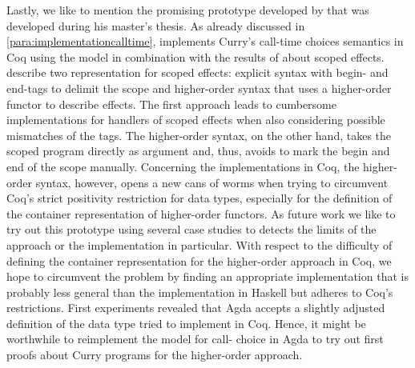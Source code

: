 Lastly, we like to mention the promising prototype developed by \citet{bunkenburg2019modeling} that was developed during his master's thesis.
As already discussed in \autoref{para:implementationcalltime}, \citeauthor{bunkenburg2019modeling} implements Curry's call-time choices semantics in Coq using the  model in combination with the results of \citet{wu2014effect} about scoped effects.
\citeauthor{wu2014effect} describe two representation for scoped effects: explicit syntax with begin- and end-tags to delimit the scope and higher-order syntax that uses a higher-order functor to describe effects.
The first approach leads to cumbersome implementations for handlers of scoped effects when also considering possible mismatches of the tags.
The higher-order syntax, on the other hand, takes the scoped program directly as argument and, thus, avoids to mark the begin and end of the scope manually.
Concerning the implementations in Coq, the higher-order syntax, however, opens a new cans of worms when trying to circumvent Coq's strict positivity restriction for data types, especially for the definition of the container representation of higher-order functors.
As future work we like to try out this prototype using several case studies to detects the limits of the approach or the implementation in particular.
With respect to the difficulty of defining the container representation for the higher-order approach in Coq, we hope to circumvent the problem by finding an appropriate implementation that is probably less general than the implementation in Haskell but
adheres to Coq's restrictions.
First experiments revealed that Agda accepts a slightly adjusted definition of the data type \citeauthor{bunkenburg2019modeling} tried to implement in Coq.
Hence, it might be worthwhile to reimplement the model for call- choice in Agda to try out first proofs about Curry programs for the higher-order approach.
